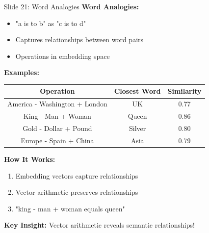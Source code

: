 \documentclass[8pt]{beamer}
\begin{document}
	\begin{frame}{Slide 21: Word Analogies}
		\fontsize{6.5}{7.5}\selectfont
		\textbf{Word Analogies:}
		\begin{itemize}
			\item "a is to b" as "c is to d"
			\item Captures relationships between word pairs
			\item Operations in embedding space
		\end{itemize}
		
		\vspace{0.1cm}
		\textbf{Examples:}
		\begin{tabular}{|c|c|c|}
			\hline
			\textbf{Operation} & \textbf{Closest Word} & \textbf{Similarity} \\
			\hline
			America - Washington + London & UK & 0.77 \\
			King - Man + Woman & Queen & 0.86 \\
			Gold - Dollar + Pound & Silver & 0.80 \\
			Europe - Spain + China & Asia & 0.79 \\
			\hline
		\end{tabular}
		
		\vspace{0.1cm}
		\textbf{How It Works:}
		\begin{enumerate}
			\item Embedding vectors capture relationships
			\item Vector arithmetic preserves relationships
			\item "king - man + woman equals queen"
		\end{enumerate}
		
		\textcolor{myblue}{\textbf{Key Insight:}} Vector arithmetic reveals semantic relationships!
	\end{frame}
	
\end{document}
